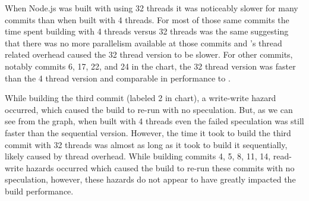 When Node.js was built with \Rattle using 32 threads it was noticeably slower for many commits than when built with 4 threads.  For most of those same commits the time \Make spent building with 4 threads versus 32 threads was the same suggesting that there was no more parallelism available at those commits and \Rattle's thread related overhead caused the 32 thread version to be slower.  For other commits, notably commits 6, 17, 22, and 24 in the chart, the 32 thread version was faster than the 4 thread version and comparable in performance to \Make.

While building the third commit (labeled 2 in chart), a write-write hazard occurred, which caused the build to re-run with no speculation.  But, as we can see from the graph, when built with 4 threads even the failed speculation was still faster than the sequential version.  However, the time it took \Rattle to build the third commit with 32 threads was almost as long as it took to build it sequentially, likely caused by thread overhead. While building commits 4, 5, 8, 11, 14, read-write hazards occurred which caused the
build to re-run these commits with no speculation, however, these hazards do not appear to have greatly impacted the build performance.








